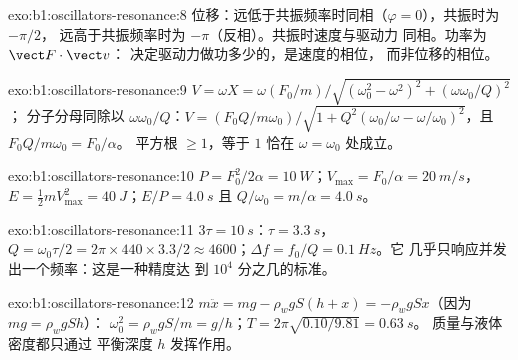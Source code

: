 \begin{solution}{exo:b1:oscillators-resonance:8}
位移：远低于共振频率时同相（$\varphi = 0$），共振时为 $-\pi/2$，
远高于共振频率时为 $-\pi$（反相）。共振时速度与驱动力
同相。功率为 $\vect F\cdot\vect v$：
决定驱动力做功多少的，是速度的相位，
而非位移的相位。
\end{solution}

\begin{solution}{exo:b1:oscillators-resonance:9}
$V = \omega X = \omega(F_0/m)/\sqrt{(\omega_0^2 - \omega^2)^2 + (\omega\omega_0/Q)^2}$；
分子分母同除以 $\omega\omega_0/Q$：$V = (F_0Q/m\omega_0)/
\sqrt{1 + Q^2(\omega_0/\omega - \omega/\omega_0)^2}$，且 $F_0Q/m\omega_0 = F_0/\alpha$。
平方根 $\geq 1$，等于 $1$ 恰在 $\omega = \omega_0$ 处成立。
\end{solution}

\begin{solution}{exo:b1:oscillators-resonance:10}
$P = F_0^2/2\alpha = \qty{10}{W}$；$V_{\max} = F_0/\alpha = \qty{20}{m/s}$，
$E = \tfrac12 mV_{\max}^2 = \qty{40}{J}$；$E/P = \qty{4.0}{s}$ 且 $Q/\omega_0 =
m/\alpha = \qty{4.0}{s}$。
\end{solution}

\begin{solution}{exo:b1:oscillators-resonance:11}
$3\tau = \qty{10}{s}$：$\tau = \qty{3.3}{s}$，$Q = \omega_0\tau/2 = 2\pi \times
440 \times 3.3/2 \approx 4600$；$\Delta f = f_0/Q = \qty{0.1}{Hz}$。它
几乎只响应并发出一个频率：这是一种精度达
到 $10^4$ 分之几的标准。
\end{solution}

\begin{solution}{exo:b1:oscillators-resonance:12}
$m\ddot x = mg - \rho_wgS(h + x) = -\rho_wgSx$（因为 $mg = \rho_wgSh$）：
$\omega_0^2 = \rho_wgS/m = g/h$；$T = 2\pi\sqrt{0.10/9.81} = \qty{0.63}{s}$。
质量与液体密度都只通过
平衡深度 $h$ 发挥作用。
\end{solution}

